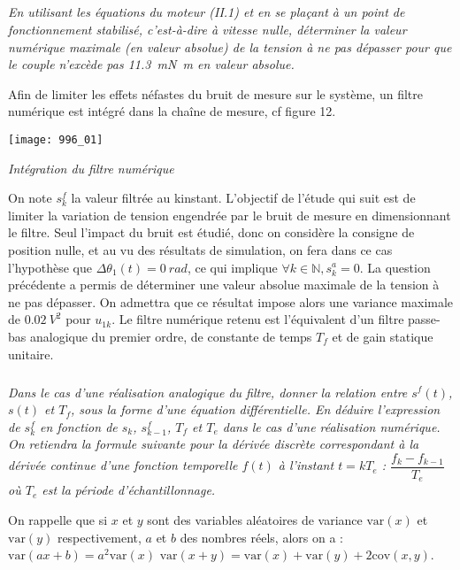 \subparagraph{}
\textit{En utilisant les équations du moteur (II.1) et en se plaçant à un point de fonctionnement stabilisé,
c’est-à-dire à vitesse nulle, déterminer la valeur numérique maximale (en valeur absolue) de la tension à ne pas
dépasser pour que le couple n’excède pas \SI{11,3}{mN.m} en valeur absolue.}
\ifprof
\begin{corrige}
\end{corrige}
\else
\fi

Afin de limiter les effets néfastes du bruit de mesure sur le système, un filtre numérique est intégré dans la
chaîne de mesure, cf figure 12.


\begin{center}

\texttt{[image: 996\_01]} 

\textit{Intégration du filtre numérique}
\end{center}

On note $s_k^f$ la valeur filtrée au k\ieme instant. L’objectif de l’étude qui suit est de limiter la variation de
tension engendrée par le bruit de mesure en dimensionnant le filtre. Seul l’impact du bruit est étudié, donc on
considère la consigne de position nulle, et au vu des résultats de simulation, on fera dans ce cas l’hypothèse que
$\Delta\theta_1(t)=\SI{0}{rad}$, ce qui implique $\forall k \in \mathbb{N}, s_k^a =0$.
La question précédente a permis de déterminer une valeur absolue maximale de la tension à ne pas dépasser. On admettra
que ce résultat impose alors une variance maximale de $\SI{0,02}{V^2}$ pour $u_{1k}$.
Le filtre numérique retenu est l’équivalent d’un filtre passe-bas analogique du premier ordre, de constante de
temps $T_f$ et de gain statique unitaire.

\subparagraph{}
\textit{Dans le cas d’une réalisation analogique du filtre, donner la relation entre $s^f(t)$, $s(t)$ et $T_f$, sous la
forme d’une équation différentielle. En déduire l’expression de $s_k^f$ en fonction de 
$s_k$, $s_{k-1}^f$, $T_f$ et $T_e$ dans le cas d'une réalisation numérique. On retiendra la formule suivante pour la dérivée discrète correspondant à la dérivée continue d’une fonction temporelle $f(t)$ à l’instant $t=kT_e$ : 
$\dfrac{f_k  -f_{k-1}}{T_e}$ où $T_e$ est la période d’échantillonnage.}

\ifprof
\begin{corrige}
\end{corrige}
\else
\fi

On rappelle que si $x$ et $y$ sont des variables aléatoires de variance $\text{var}(x)$ et $\text{var}(y)$ respectivement, $a$ et $b$ des nombres réels, alors on a : $\text{var}\left(ax+b\right) = a^2 \text{var}(x)$ $\text{var}\left(x+y\right) = \text{var}(x)+\text{var}(y)+2\text{cov}(x,y)$. 


